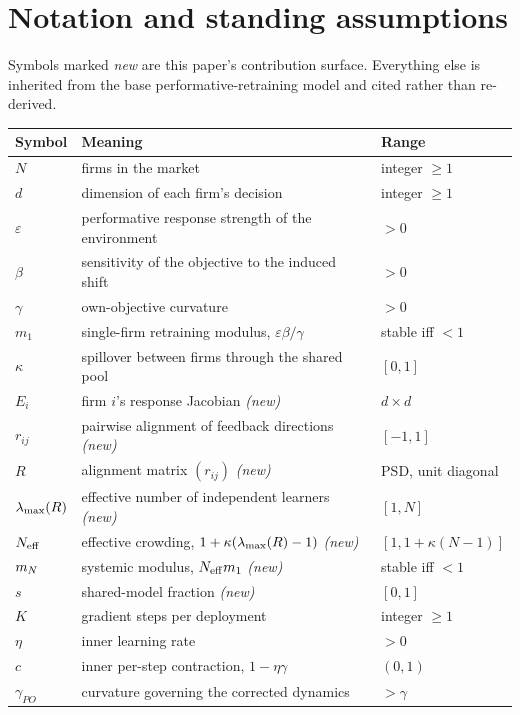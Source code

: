 \section{Notation and standing assumptions}
\label{app:notation}

Symbols marked \emph{new} are this paper's contribution surface. Everything else is inherited from the base performative-retraining model and cited rather than re-derived.

\begin{center}
\small
\begin{tabular}{lll}
\toprule
Symbol & Meaning & Range \\
\midrule
$N$ & firms in the market & integer $\geq 1$ \\
$d$ & dimension of each firm's decision & integer $\geq 1$ \\
$\varepsilon$ & performative response strength of the environment & $>0$ \\
$\beta$ & sensitivity of the objective to the induced shift & $>0$ \\
$\gamma$ & own-objective curvature & $>0$ \\
$m_1$ & single-firm retraining modulus, $\varepsilon\beta/\gamma$ & stable iff $<1$ \\
$\kappa$ & spillover between firms through the shared pool & $[0,1]$ \\
$E_i$ & firm $i$'s response Jacobian \emph{(new)} & $d \times d$ \\
$r_{ij}$ & pairwise alignment of feedback directions \emph{(new)} & $[-1,1]$ \\
$R$ & alignment matrix $(r_{ij})$ \emph{(new)} & PSD, unit diagonal \\
$\lambda_{\max}(R)$ & effective number of independent learners \emph{(new)} & $[1,N]$ \\
$N_{\mathrm{eff}}$ & effective crowding, $1+\kappa(\lambda_{\max}(R)-1)$ \emph{(new)} & $[1, 1+\kappa(N-1)]$ \\
$m_N$ & systemic modulus, $N_{\mathrm{eff}} m_1$ \emph{(new)} & stable iff $<1$ \\
$s$ & shared-model fraction \emph{(new)} & $[0,1]$ \\
$K$ & gradient steps per deployment & integer $\geq 1$ \\
$\eta$ & inner learning rate & $>0$ \\
$c$ & inner per-step contraction, $1-\eta\gamma$ & $(0,1)$ \\
$\gamma_{PO}$ & curvature governing the corrected dynamics & $>\gamma$ \\

\end{tabular}
\end{center}
